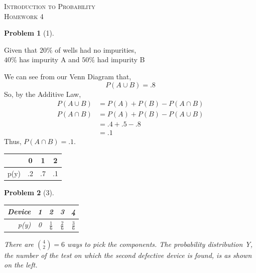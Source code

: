 \documentclass{article}
\theoremstyle{problem}
\newtheorem{prob}{Problem}
\def\Acircle{(180:1cm) circle (2cm)}
\def\Bcircle{(0:1cm) circle (2cm)}
\def\ABComp{(-3.5,-2.5) rectangle (3.5,2.5)}
\begin{document}
\begin{center}
  \textsc{\Large Introduction to Probability}\\[.3cm]
  \textsc{\Large Homework 4}
\end{center}

\begin{prob}[1]
 
\end{prob}
\begin{multicols}{2}
  Given that $20\%$ of wells had no impurities, \\$40\%$ has impurity A and $50\%$ had impurity B \\
  \vfill
  \columnbreak
  We can see from our Venn Diagram that, $$P(A \cup B) = .8$$ So, by the Additive Law, 
  \begin{align*}
    P(A \cup B) &= P(A) + P(B) - P(A \cap B)\\
    P(A \cap B) &= P(A) + P(B) - P(A \cup B)\\
                &= .4 + .5 - .8\\
                &= .1
  \end{align*}
    Thus, $P(A \cap B) = .1$.\\[.5cm]
 
  \begin{tabular}{r|c c c}
    & 0 & 1 & 2 \\
    \hline
    p(y) & .2 & .7 & .1
  \end{tabular}
\end{multicols}

\begin{prob}[3]
\begin{multicols}{2}

\begin{tabular}{r|c c c c}
Device & 1 & 2 & 3 & 4\\
\hline
p(y) & 0 & $\frac{1}{6}$ & $\frac{2}{6}$ & $\frac{3}{6}$\\
\end{tabular}
\vfill
\columnbreak
  There are ${4 \choose 2} = 6$ ways to pick the components. The probability distribution Y, the number of the test on which the second defective device is found, is as shown on the left.
\end{multicols}
\end{prob}
\end{document}
